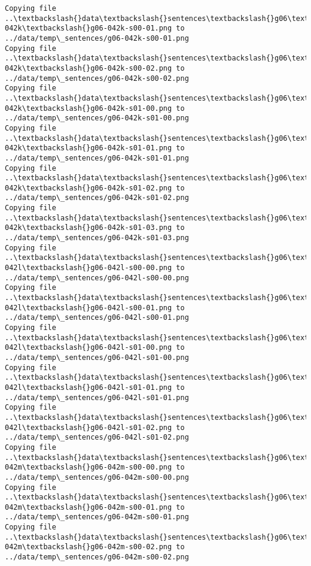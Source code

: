 \documentclass[11pt]{article}
\begin{document}
\begin{Verbatim}[commandchars=\\\{\}]
Copying file ..\textbackslash{}data\textbackslash{}sentences\textbackslash{}g06\textbackslash{}g06-042k\textbackslash{}g06-042k-s00-01.png to
../data/temp\_sentences/g06-042k-s00-01.png
Copying file ..\textbackslash{}data\textbackslash{}sentences\textbackslash{}g06\textbackslash{}g06-042k\textbackslash{}g06-042k-s00-02.png to
../data/temp\_sentences/g06-042k-s00-02.png
Copying file ..\textbackslash{}data\textbackslash{}sentences\textbackslash{}g06\textbackslash{}g06-042k\textbackslash{}g06-042k-s01-00.png to
../data/temp\_sentences/g06-042k-s01-00.png
Copying file ..\textbackslash{}data\textbackslash{}sentences\textbackslash{}g06\textbackslash{}g06-042k\textbackslash{}g06-042k-s01-01.png to
../data/temp\_sentences/g06-042k-s01-01.png
Copying file ..\textbackslash{}data\textbackslash{}sentences\textbackslash{}g06\textbackslash{}g06-042k\textbackslash{}g06-042k-s01-02.png to
../data/temp\_sentences/g06-042k-s01-02.png
Copying file ..\textbackslash{}data\textbackslash{}sentences\textbackslash{}g06\textbackslash{}g06-042k\textbackslash{}g06-042k-s01-03.png to
../data/temp\_sentences/g06-042k-s01-03.png
Copying file ..\textbackslash{}data\textbackslash{}sentences\textbackslash{}g06\textbackslash{}g06-042l\textbackslash{}g06-042l-s00-00.png to
../data/temp\_sentences/g06-042l-s00-00.png
Copying file ..\textbackslash{}data\textbackslash{}sentences\textbackslash{}g06\textbackslash{}g06-042l\textbackslash{}g06-042l-s00-01.png to
../data/temp\_sentences/g06-042l-s00-01.png
Copying file ..\textbackslash{}data\textbackslash{}sentences\textbackslash{}g06\textbackslash{}g06-042l\textbackslash{}g06-042l-s01-00.png to
../data/temp\_sentences/g06-042l-s01-00.png
Copying file ..\textbackslash{}data\textbackslash{}sentences\textbackslash{}g06\textbackslash{}g06-042l\textbackslash{}g06-042l-s01-01.png to
../data/temp\_sentences/g06-042l-s01-01.png
Copying file ..\textbackslash{}data\textbackslash{}sentences\textbackslash{}g06\textbackslash{}g06-042l\textbackslash{}g06-042l-s01-02.png to
../data/temp\_sentences/g06-042l-s01-02.png
Copying file ..\textbackslash{}data\textbackslash{}sentences\textbackslash{}g06\textbackslash{}g06-042m\textbackslash{}g06-042m-s00-00.png to
../data/temp\_sentences/g06-042m-s00-00.png
Copying file ..\textbackslash{}data\textbackslash{}sentences\textbackslash{}g06\textbackslash{}g06-042m\textbackslash{}g06-042m-s00-01.png to
../data/temp\_sentences/g06-042m-s00-01.png
Copying file ..\textbackslash{}data\textbackslash{}sentences\textbackslash{}g06\textbackslash{}g06-042m\textbackslash{}g06-042m-s00-02.png to
../data/temp\_sentences/g06-042m-s00-02.png

\end{Verbatim}
\end{document}
